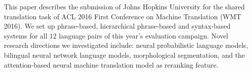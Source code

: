 This paper describes the submission of Johns Hopkins University for the shared translation task of ACL 2016 First Conference on Machine Translation (WMT 2016). We set up phrase-based, hierarchical phrase-based and syntax-based systems for all 12 language pairs of this year's evaluation campaign. Novel research directions we investigated include: neural probabilistic language models, bilingual neural network language models, morphological segmentation, and the attention-based neural machine translation model as reranking feature.
